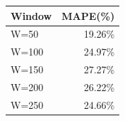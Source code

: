 {\tiny\setlength{\tabcolsep}{2pt}\begin{tabular}{lr} \toprule
Window & MAPE(\%) \\ \midrule
W=50 & 19.26\% \\ 
W=100 & 24.97\% \\ 
W=150 & 27.27\% \\ 
W=200 & 26.22\% \\ 
W=250 & 24.66\% \\ 
\bottomrule \end{tabular}}